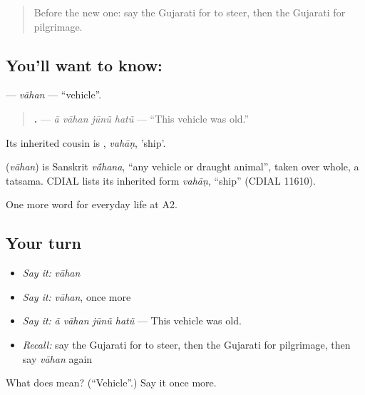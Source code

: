 \label{lesson:GU-C211-vahan}



\begin{quote}
Before the new one: say the Gujarati for to steer, then the Gujarati for pilgrimage.
\end{quote}

\subsection*{You'll want to know: }
\textbf{} — \emph{vāhan} — \textquotedblleft{}vehicle\textquotedblright{}.

\begin{quote}
\textbf{   .} — \emph{ā vāhan jūnũ hatũ} — \textquotedblleft{}This vehicle was old.\textquotedblright{}
\end{quote}

Its inherited cousin is \textbf{}, \emph{vahāṇ}, 'ship'.

\begin{cousinweb}
\textbf{} (\emph{vāhan}) is Sanskrit \emph{v\'{\={a}}hana}, \textquotedblleft{}any vehicle or draught animal\textquotedblright{}, taken over whole, a tatsama. CDIAL lists its inherited form \emph{vahāṇ}, \textquotedblleft{}ship\textquotedblright{} (CDIAL 11610).
\end{cousinweb}

\begin{grammarlens}[title={What you've built}]
One more word for everyday life at A2.
\end{grammarlens}

\subsection*{Your turn}
\begin{itemize}
\raggedright
  \item \emph{Say it:} \emph{vāhan}
  \item \emph{Say it:} \emph{vāhan}, once more
  \item \emph{Say it:} \emph{ā vāhan jūnũ hatũ} — This vehicle was old.
  \item \emph{Recall:} say the Gujarati for to steer, then the Gujarati for pilgrimage, then say \emph{vāhan} again
\end{itemize}

\begin{tcolorbox}[breakable,colback=teal!4,colframe=teal!35!black,title={Before you move on}]
What does  mean? (\textquotedblleft{}Vehicle\textquotedblright{}.) Say it once more.
\end{tcolorbox}
